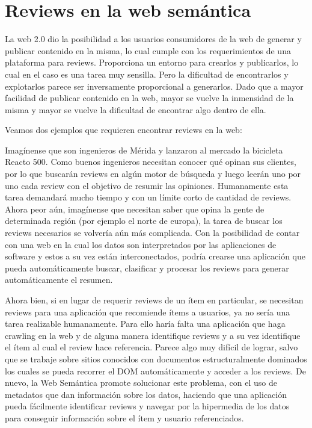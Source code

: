 \section{Reviews en la web semántica}
\label{section:reviews-en-la-web}

La web 2.0 dio la posibilidad a los usuarios consumidores de la web de generar y publicar contenido en la misma, lo cual cumple con los requerimientos de una plataforma para reviews. Proporciona un entorno para crearlos y publicarlos, lo cual en el caso es una tarea muy sensilla. 
Pero la dificultad de encontrarlos y explotarlos parece ser inversamente proporcional a generarlos. Dado que a mayor facilidad de publicar contenido en la web, mayor se vuelve la inmensidad de la misma y mayor se vuelve la dificultad de encontrar algo dentro de ella.

Veamos dos ejemplos que requieren encontrar reviews en la web:

Imagínense que son ingenieros de Mérida y lanzaron al mercado la bicicleta Reacto 500. Como buenos ingenieros necesitan conocer qué opinan sus clientes, por lo que buscarán reviews en algún motor de búsqueda y luego leerán uno por uno cada review con el objetivo de resumir las opiniones. Humanamente esta tarea demandará mucho tiempo y con un límite corto de cantidad de reviews. 
Ahora peor aún, imagínense que necesitan saber que opina la gente de determinada región (por ejemplo el norte de europa), la tarea de buscar los reviews necesarios se volvería aún más complicada.
Con la posibilidad de contar con una web en la cual los datos son interpretados por las aplicaciones de software y estos a su vez están interconectados, podría crearse una aplicación que pueda automáticamente buscar, clasificar y procesar los reviews para generar automáticamente el resumen.

Ahora bien, si en lugar de requerir reviews de un ítem en particular, se necesitan reviews para una aplicación que recomiende ítems a usuarios, ya no sería una tarea realizable humanamente. Para ello haría falta una aplicación que haga crawling en la web y de alguna manera identifique reviews y a su vez identifique el ítem al cual el review hace referencia. 
Parece algo muy difícil de lograr, salvo que se trabaje sobre sitios conocidos con documentos estructuralmente dominados los cuales se pueda recorrer el DOM automáticamente y acceder a los reviews.
De nuevo, la Web Semántica promote solucionar este problema, con el uso de metadatos que dan información sobre los datos, haciendo que una aplicación pueda fácilmente identificar reviews y navegar por la hipermedia de los datos para conseguir información sobre el ítem y usuario referenciados.

